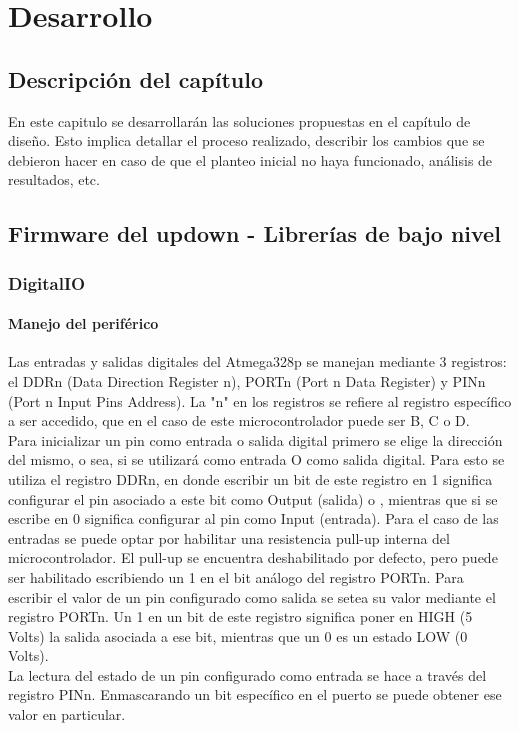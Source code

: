 \chapter{Desarrollo}
\thispagestyle{empty}

\section{Descripción del capítulo} \label{sec:\thesection}
En este capitulo se desarrollarán las soluciones propuestas en el capítulo de diseño. Esto implica detallar el proceso realizado, describir los cambios que se debieron hacer en caso de que el planteo inicial no haya funcionado, análisis de resultados, etc. \\

\section{Firmware del updown - Librerías de bajo nivel} \label{sec:\thesection}

\subsection{DigitalIO}

\subsubsection{Manejo del periférico}

Las entradas y salidas digitales del Atmega328p se manejan mediante 3 registros: el DDRn (Data Direction Register n), PORTn (Port n Data Register) y PINn (Port n Input Pins Address). La "n" en los registros se refiere al registro específico a ser accedido, que en el caso de este microcontrolador puede ser B, C o D.\\

Para inicializar un pin como entrada o salida digital primero se elige la dirección del mismo, o sea, si se utilizará como entrada O como salida digital. Para esto se utiliza el registro DDRn, en donde escribir un bit de este registro en 1 significa configurar el pin asociado a este bit como Output (salida) o , mientras que si se escribe en 0 significa configurar al pin como Input (entrada). Para el caso de las entradas se puede optar por habilitar una resistencia pull-up interna del microcontrolador. El pull-up se encuentra deshabilitado por defecto, pero puede ser habilitado escribiendo un 1 en el bit análogo del registro PORTn.
Para escribir el valor de un pin configurado como salida se setea su valor mediante el registro PORTn. Un 1 en un bit de este registro significa poner en HIGH (5 Volts) la salida asociada a ese bit, mientras que un 0 es un estado LOW (0 Volts).\\
La lectura del estado de un pin configurado como entrada se hace a través del registro PINn. Enmascarando un bit específico en el puerto se puede obtener ese valor en particular.

